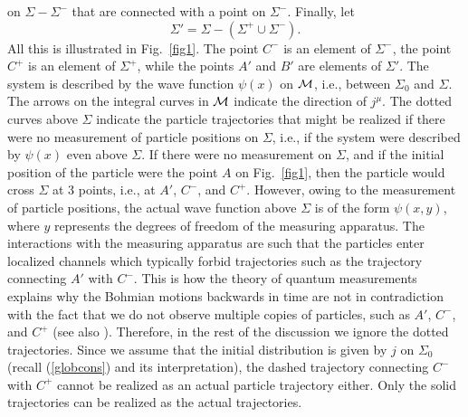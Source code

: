\documentclass[12pt]{article}
\begin{document}
on $\Sigma-\Sigma^-$ that are connected with a point on $\Sigma^-$. 
Finally, let 
\begin{equation}
\Sigma'=\Sigma -(\Sigma^+\cup\Sigma^-) .
\end{equation}
All this is illustrated in Fig.~\ref{fig1}. 
The point $C^-$ is an element of $\Sigma^-$, the point
$C^+$ is an element of $\Sigma^+$, while the points
$A'$ and $B'$ are elements of $\Sigma'$.
The system is described by the wave function $\psi(x)$ 
on ${\cal M}$, 
i.e., between $\Sigma_0$ and $\Sigma$.
The arrows on the 
integral curves in ${\cal M}$ indicate the direction of $j^{\mu}$. 
The dotted curves above $\Sigma$ indicate the particle trajectories 
that might be realized if there were no measurement of particle 
positions on $\Sigma$, i.e., if the system were described by $\psi(x)$ 
even above 
$\Sigma$. If there were no measurement on $\Sigma$, and if the 
initial position of the particle were the point $A$ on Fig.~\ref{fig1}, 
then 
the particle would cross $\Sigma$ at 3 points, i.e., at $A'$, $C^-$, and 
$C^+$. However, owing to the measurement of particle positions, 
the actual wave function above $\Sigma$ is of the form $\psi(x,y)$, 
where $y$ represents the degrees of freedom of the measuring apparatus.
The interactions with the measuring apparatus 
are such that the particles enter localized channels
\cite{bohm,bohmPR1,holbook,nikoldbb1} which typically forbid 
trajectories such as the trajectory connecting $A'$ with $C^-$. This is how 
the theory of quantum measurements explains why the 
Bohmian motions backwards 
in time are not in contradiction with the fact that we do not observe 
multiple copies of particles, such as $A'$, $C^-$, and $C^+$ (see also
\cite{nikoldbb1}). Therefore, in the 
rest of the discussion we ignore the dotted trajectories.
Since we assume 
that the initial distribution is given by $j$ on $\Sigma_0$
(recall (\ref{globcons}) and its interpretation),
the dashed trajectory connecting $C^-$ with $C^+$ 
cannot be realized as an actual particle trajectory either. Only 
the solid trajectories can be realized as the actual trajectories.  
\end{document}
